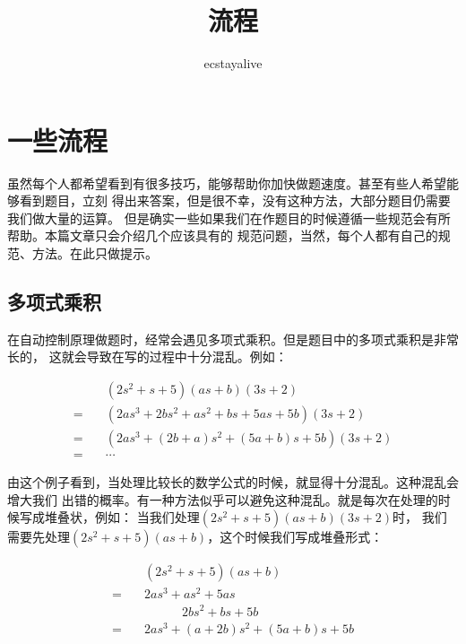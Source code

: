 \documentclass{ctexart}
\begin{document}
\title{流程}
\author{ecstayalive}
\maketitle

\section*{一些流程}
虽然每个人都希望看到有很多技巧，能够帮助你加快做题速度。甚至有些人希望能够看到题目，立刻
得出来答案，但是很不幸，没有这种方法，大部分题目仍需要我们做大量的运算。
但是确实一些如果我们在作题目的时候遵循一些规范会有所帮助。本篇文章只会介绍几个应该具有的
规范问题，当然，每个人都有自己的规范、方法。在此只做提示。

\subsection*{多项式乘积}
在自动控制原理做题时，经常会遇见多项式乘积。但是题目中的多项式乘积是非常长的，
这就会导致在写的过程中十分混乱。例如：

\begin{equation}
    \begin{aligned}
        \quad   & (2 s^2 + s + 5)(a s + b)(3s + 2)                    \\
        = \quad & (2a s^3 + 2b s^2 + a s^2 + b s + 5a s + 5b)(3s + 2) \\
        = \quad & (2a s^3 + (2b + a) s^2 + (5a + b)s + 5b)(3s + 2)    \\
        = \quad & \cdots
    \end{aligned}
    \label{eq:1}
\end{equation}

由这个例子看到，当处理比较长的数学公式的时候，就显得十分混乱。这种混乱会增大我们
出错的概率。有一种方法似乎可以避免这种混乱。就是每次在处理的时候写成堆叠状，例如：
当我们处理$(2 s^2 + s + 5)(a s + b)(3s + 2)$时，
我们需要先处理$(2 s^2 + s + 5)(a s + b)$，这个时候我们写成堆叠形式：

\begin{equation}
    \begin{aligned}
        \quad   & (2 s^2 + s + 5)(a s + b)               \\
        = \quad & 2a s^3 + a s^2 + 5a s                  \\
        \quad   & \qquad \quad 2b s^2  + b s  + 5b       \\
        = \quad & 2a s^3 + (a + 2b) s^2 + (5a + b)s + 5b
    \end{aligned}
    \label{eq:2}
\end{equation}
\end{document}
